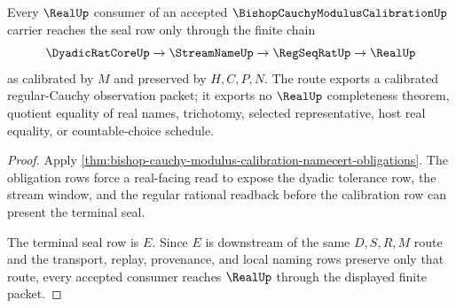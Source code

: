 \begin{theorem}
\label{thm:bishop-cauchy-modulus-calibration-seal-route}
Every $\RealUp$ consumer of an accepted $\BishopCauchyModulusCalibrationUp$ carrier reaches the seal row only through the finite chain
$$
\DyadicRatCoreUp \to \StreamNameUp \to \RegSeqRatUp \to \RealUp
$$
as calibrated by $M$ and preserved by $H,C,P,N$. The route exports a calibrated regular-Cauchy observation packet; it exports no $\RealUp$ completeness theorem, quotient equality of real names, trichotomy, selected representative, host real equality, or countable-choice schedule.
\end{theorem}
\begin{proof}
Apply \autoref{thm:bishop-cauchy-modulus-calibration-namecert-obligations}. The obligation rows force a real-facing read to expose the dyadic tolerance row, the stream window, and the regular rational readback before the calibration row can present the terminal seal.

The terminal seal row is $E$. Since $E$ is downstream of the same $D,S,R,M$ route and the transport, replay, provenance, and local naming rows preserve only that route, every accepted consumer reaches $\RealUp$ through the displayed finite packet.
\end{proof}




